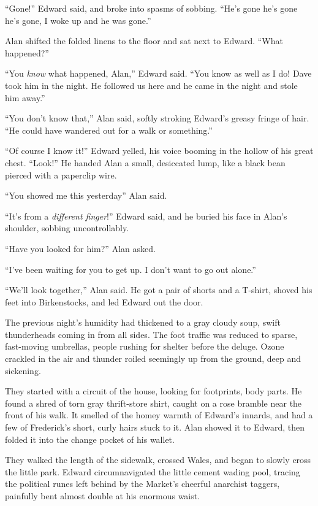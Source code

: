``Gone!'' Edward said, and broke into spasms of sobbing.  ``He's gone
he's gone he's gone, I woke up and he was gone.''

Alan shifted the folded linens to the floor and sat next to Edward. 
``What happened?''

``You \textit{know} what happened, Alan,'' Edward said.  ``You know as
well as I do!  Dave took him in the night.  He followed us here and he
came in the night and stole him away.''

``You don't know that,'' Alan said, softly stroking Edward's greasy
fringe of hair.  ``He could have wandered out for a walk or
something.''

``Of course I know it!'' Edward yelled, his voice booming in the
hollow of his great chest.  ``Look!'' He handed Alan a small,
desiccated lump, like a black bean pierced with a paperclip wire.

``You showed me this yesterday\dash{}'' Alan said.

``It's from a \textit{different finger}!'' Edward said, and he buried
his face in Alan's shoulder, sobbing uncontrollably.

``Have you looked for him?'' Alan asked.

``I've been waiting for you to get up.  I don't want to go out
alone.''

``We'll look together,'' Alan said.  He got a pair of shorts and a
T-shirt, shoved his feet into Birkenstocks, and led Edward out the
door.

The previous night's humidity had thickened to a gray cloudy soup,
swift thunderheads coming in from all sides.  The foot traffic was
reduced to sparse, fast-moving umbrellas, people rushing for shelter
before the deluge.  Ozone crackled in the air and thunder roiled
seemingly up from the ground, deep and sickening.

They started with a circuit of the house, looking for footprints, body
parts.  He found a shred of torn gray thrift-store shirt, caught on a
rose bramble near the front of his walk.  It smelled of the homey
warmth of Edward's innards, and had a few of Frederick's short, curly
hairs stuck to it.  Alan showed it to Edward, then folded it into the
change pocket of his wallet.

They walked the length of the sidewalk, crossed Wales, and began to
slowly cross the little park.  Edward circumnavigated the little
cement wading pool, tracing the political runes left behind by the
Market's cheerful anarchist taggers, painfully bent almost double at
his enormous waist.

